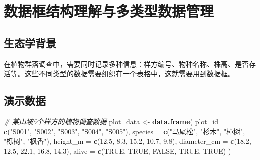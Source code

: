 \documentclass[
]{book}
\newenvironment{Shaded}{\begin{snugshade}}{\end{snugshade}}
\newcommand{\AttributeTok}[1]{\textcolor[rgb]{0.13,0.29,0.53}{#1}}
\newcommand{\CommentTok}[1]{\textcolor[rgb]{0.56,0.35,0.01}{\textit{#1}}}
\newcommand{\ConstantTok}[1]{\textcolor[rgb]{0.56,0.35,0.01}{#1}}
\newcommand{\FloatTok}[1]{\textcolor[rgb]{0.00,0.00,0.81}{#1}}
\newcommand{\FunctionTok}[1]{\textcolor[rgb]{0.13,0.29,0.53}{\textbf{#1}}}
\newcommand{\NormalTok}[1]{#1}
\newcommand{\OtherTok}[1]{\textcolor[rgb]{0.56,0.35,0.01}{#1}}
\newcommand{\StringTok}[1]{\textcolor[rgb]{0.31,0.60,0.02}{#1}}
\begin{document}
\hypertarget{ux6570ux636eux6846ux7ed3ux6784ux7406ux89e3ux4e0eux591aux7c7bux578bux6570ux636eux7ba1ux7406}{%
\section{数据框结构理解与多类型数据管理}\label{ux6570ux636eux6846ux7ed3ux6784ux7406ux89e3ux4e0eux591aux7c7bux578bux6570ux636eux7ba1ux7406}}

\hypertarget{ux751fux6001ux5b66ux80ccux666f-2}{%
\subsection{生态学背景}\label{ux751fux6001ux5b66ux80ccux666f-2}}

在植物群落调查中，需要同时记录多种信息：样方编号、物种名称、株高、是否存活等。这些不同类型的数据需要组织在一个表格中，这就需要用到数据框。

\hypertarget{ux6f14ux793aux6570ux636e-2}{%
\subsection{演示数据}\label{ux6f14ux793aux6570ux636e-2}}

\begin{Shaded}
\begin{Highlighting}[]
\CommentTok{\# 某山坡5个样方的植物调查数据}
\NormalTok{plot\_data }\OtherTok{\textless{}{-}} \FunctionTok{data.frame}\NormalTok{(}
  \AttributeTok{plot\_id =} \FunctionTok{c}\NormalTok{(}\StringTok{"S001"}\NormalTok{, }\StringTok{"S002"}\NormalTok{, }\StringTok{"S003"}\NormalTok{, }\StringTok{"S004"}\NormalTok{, }\StringTok{"S005"}\NormalTok{),}
  \AttributeTok{species =} \FunctionTok{c}\NormalTok{(}\StringTok{"马尾松"}\NormalTok{, }\StringTok{"杉木"}\NormalTok{, }\StringTok{"樟树"}\NormalTok{, }\StringTok{"栎树"}\NormalTok{, }\StringTok{"枫香"}\NormalTok{),}
  \AttributeTok{height\_m =} \FunctionTok{c}\NormalTok{(}\FloatTok{12.5}\NormalTok{, }\FloatTok{8.3}\NormalTok{, }\FloatTok{15.2}\NormalTok{, }\FloatTok{10.7}\NormalTok{, }\FloatTok{9.8}\NormalTok{),}
  \AttributeTok{diameter\_cm =} \FunctionTok{c}\NormalTok{(}\FloatTok{18.2}\NormalTok{, }\FloatTok{12.5}\NormalTok{, }\FloatTok{22.1}\NormalTok{, }\FloatTok{16.8}\NormalTok{, }\FloatTok{14.3}\NormalTok{),}
  \AttributeTok{alive =} \FunctionTok{c}\NormalTok{(}\ConstantTok{TRUE}\NormalTok{, }\ConstantTok{TRUE}\NormalTok{, }\ConstantTok{FALSE}\NormalTok{, }\ConstantTok{TRUE}\NormalTok{, }\ConstantTok{TRUE}\NormalTok{)}
\NormalTok{)}
\end{Highlighting}
\end{Shaded}
\end{document}

